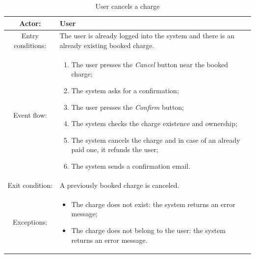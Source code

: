 \begin{table}[h]
    \begin{center}
        \begin{tabular}{|c||p{10cm}|}
            \hline
            Actor:            & User                                                                                       \\
            \hline
            Entry conditions: & The user is already logged into the system and there is an already existing booked charge. \\
            \hline
            Event flow:       &
            \begin{enumerate}
                \item The user presses the \textit{Cancel} button near the booked charge;
                \item The system asks for a confirmation;
                \item The user presses the \textit{Confirm} button;
                \item The system checks the charge existence and ownership;
                \item The system cancels the charge and in case of an already paid one, it refunds the user;
                \item The system sends a confirmation email.
            \end{enumerate}
            \\
            \hline
            Exit condition:   & A previously booked charge is canceled.                                                    \\
            \hline
            Exceptions:       &
            \begin{itemize}
                \item The charge does not exist: the system returns an error message;
                \item The charge does not belong to the user: the system returns an error message.
            \end{itemize}
            \\
            \hline
        \end{tabular}
    \end{center}
    \caption{User cancels a charge}
\end{table}

